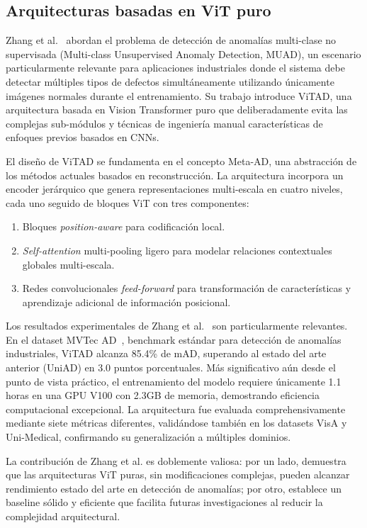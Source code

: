 \subsection{Arquitecturas basadas en ViT puro}

Zhang et al.~\cite{zhang2025exploring} abordan el problema de detección de anomalías multi-clase no supervisada (Multi-class Unsupervised Anomaly Detection, MUAD), un escenario particularmente relevante para aplicaciones industriales donde el sistema debe detectar múltiples tipos de defectos simultáneamente utilizando únicamente imágenes normales durante el entrenamiento. Su trabajo introduce ViTAD, una arquitectura basada en Vision Transformer puro que deliberadamente evita las complejas sub-módulos y técnicas de ingeniería manual características de enfoques previos basados en CNNs.

El diseño de ViTAD se fundamenta en el concepto Meta-AD, una abstracción de los métodos actuales basados en reconstrucción. La arquitectura incorpora un encoder jerárquico que genera representaciones multi-escala en cuatro niveles, cada uno seguido de bloques ViT con tres componentes:
\begin{enumerate}
    \item Bloques \textit{position-aware} para codificación local.
    \item \textit{Self-attention} multi-pooling ligero para modelar relaciones contextuales globales multi-escala.
    \item Redes convolucionales \textit{feed-forward} para transformación de características y aprendizaje adicional de información posicional.
\end{enumerate}

Los resultados experimentales de Zhang et al.~\cite{zhang2025exploring} son particularmente relevantes. En el dataset MVTec AD~\cite{bergmann2019mvtec}, benchmark estándar para detección de anomalías industriales, ViTAD alcanza 85.4\% de \acrfull{mAD}, superando al estado del arte anterior (UniAD) en 3.0 puntos porcentuales. Más significativo aún desde el punto de vista práctico, el entrenamiento del modelo requiere únicamente 1.1 horas en una GPU V100 con 2.3GB de memoria, demostrando eficiencia computacional excepcional. La arquitectura fue evaluada comprehensivamente mediante siete métricas diferentes, validándose también en los datasets VisA y Uni-Medical, confirmando su generalización a múltiples dominios.

La contribución de Zhang et al. es doblemente valiosa: por un lado, demuestra que las arquitecturas ViT puras, sin modificaciones complejas, pueden alcanzar rendimiento estado del arte en detección de anomalías; por otro, establece un baseline sólido y eficiente que facilita futuras investigaciones al reducir la complejidad arquitectural.

